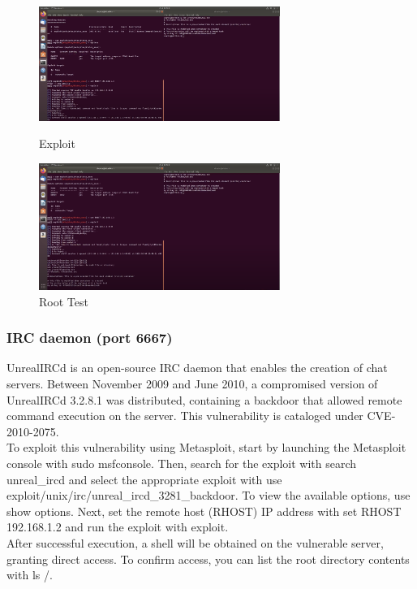 \documentclass[a4paper,11pt]{article} %
\begin{document}
\break

\begin{figure}[h!]
    \centering
    \includegraphics[width=0.7\textwidth]{images/08.png}
    \caption{Exploit}
    \includegraphics[width=0.7\textwidth]{images/09.png}
    \caption{Root Test}
\end{figure}

\subsubsection{IRC daemon (port 6667)}
UnrealIRCd is an open-source IRC daemon that enables the creation of chat servers. Between November 2009 and June 2010, a compromised version of UnrealIRCd 3.2.8.1 was distributed, containing a backdoor that allowed remote command execution on the server. This vulnerability is cataloged under CVE-2010-2075.\\
To exploit this vulnerability using Metasploit, start by launching the Metasploit console with sudo msfconsole. Then, search for the exploit with search unreal\_ircd and select the appropriate exploit with use exploit/unix/irc/unreal\_ircd\_3281\_backdoor. To view the available options, use show options. Next, set the remote host (RHOST) IP address with set RHOST 192.168.1.2 and run the exploit with exploit. \\
After successful execution, a shell will be obtained on the vulnerable server, granting direct access. To confirm access, you can list the root directory contents with ls /. 

\break 
\end{document}
